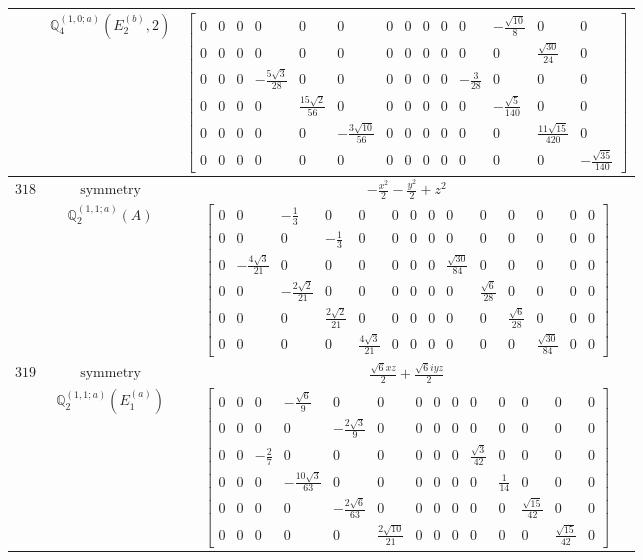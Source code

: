 \documentclass[fleqn,8pt,landscape]{jsarticle}
\begin{document}
\begin{longtable}{ccc}
$  $ & $ \mathbb{Q}_{4}^{(1,0;a)}(E_{2}^{(b)},2) $ & $ \begin{bmatrix} 0 & 0 & 0 & 0 & 0 & 0 & 0 & 0 & 0 & 0 & 0 & - \frac{\sqrt{10}}{8} & 0 & 0 \\ 0 & 0 & 0 & 0 & 0 & 0 & 0 & 0 & 0 & 0 & 0 & 0 & \frac{\sqrt{30}}{24} & 0 \\ 0 & 0 & 0 & - \frac{5 \sqrt{3}}{28} & 0 & 0 & 0 & 0 & 0 & 0 & - \frac{3}{28} & 0 & 0 & 0 \\ 0 & 0 & 0 & 0 & \frac{15 \sqrt{2}}{56} & 0 & 0 & 0 & 0 & 0 & 0 & - \frac{\sqrt{5}}{140} & 0 & 0 \\ 0 & 0 & 0 & 0 & 0 & - \frac{3 \sqrt{10}}{56} & 0 & 0 & 0 & 0 & 0 & 0 & \frac{11 \sqrt{15}}{420} & 0 \\ 0 & 0 & 0 & 0 & 0 & 0 & 0 & 0 & 0 & 0 & 0 & 0 & 0 & - \frac{\sqrt{35}}{140} \end{bmatrix} $ \\ \hline
$ 318 $ & $ \text{symmetry} $ & $ - \frac{x^{2}}{2} - \frac{y^{2}}{2} + z^{2} $ \\
$  $ & $ \mathbb{Q}_{2}^{(1,1;a)}(A) $ & $ \begin{bmatrix} 0 & 0 & - \frac{1}{3} & 0 & 0 & 0 & 0 & 0 & 0 & 0 & 0 & 0 & 0 & 0 \\ 0 & 0 & 0 & - \frac{1}{3} & 0 & 0 & 0 & 0 & 0 & 0 & 0 & 0 & 0 & 0 \\ 0 & - \frac{4 \sqrt{3}}{21} & 0 & 0 & 0 & 0 & 0 & 0 & \frac{\sqrt{30}}{84} & 0 & 0 & 0 & 0 & 0 \\ 0 & 0 & - \frac{2 \sqrt{2}}{21} & 0 & 0 & 0 & 0 & 0 & 0 & \frac{\sqrt{6}}{28} & 0 & 0 & 0 & 0 \\ 0 & 0 & 0 & \frac{2 \sqrt{2}}{21} & 0 & 0 & 0 & 0 & 0 & 0 & \frac{\sqrt{6}}{28} & 0 & 0 & 0 \\ 0 & 0 & 0 & 0 & \frac{4 \sqrt{3}}{21} & 0 & 0 & 0 & 0 & 0 & 0 & \frac{\sqrt{30}}{84} & 0 & 0 \end{bmatrix} $ \\ \hline
$ 319 $ & $ \text{symmetry} $ & $ \frac{\sqrt{6} x z}{2} + \frac{\sqrt{6} i y z}{2} $ \\
$  $ & $ \mathbb{Q}_{2}^{(1,1;a)}(E_{1}^{(a)}) $ & $ \begin{bmatrix} 0 & 0 & 0 & - \frac{\sqrt{6}}{9} & 0 & 0 & 0 & 0 & 0 & 0 & 0 & 0 & 0 & 0 \\ 0 & 0 & 0 & 0 & - \frac{2 \sqrt{3}}{9} & 0 & 0 & 0 & 0 & 0 & 0 & 0 & 0 & 0 \\ 0 & 0 & - \frac{2}{7} & 0 & 0 & 0 & 0 & 0 & 0 & \frac{\sqrt{3}}{42} & 0 & 0 & 0 & 0 \\ 0 & 0 & 0 & - \frac{10 \sqrt{3}}{63} & 0 & 0 & 0 & 0 & 0 & 0 & \frac{1}{14} & 0 & 0 & 0 \\ 0 & 0 & 0 & 0 & - \frac{2 \sqrt{6}}{63} & 0 & 0 & 0 & 0 & 0 & 0 & \frac{\sqrt{15}}{42} & 0 & 0 \\ 0 & 0 & 0 & 0 & 0 & \frac{2 \sqrt{10}}{21} & 0 & 0 & 0 & 0 & 0 & 0 & \frac{\sqrt{15}}{42} & 0 \end{bmatrix} $ \\ \hline

\end{longtable}
\end{document}
